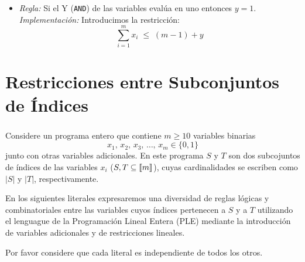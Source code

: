 \documentclass[ 10pt, xcolor = dvipsnames]{beamer}
\begin{document}
\begin{frame}[allowframebreaks]
\frametitle{\insertsection}

\begin{itemize}
\item \emph{Regla:} Si el Y (\texttt{AND}) de las variables eval\'ua en uno entonces $y = 1$. \\[1ex] \emph{Implementaci\'on:} Introducimos la restricci\'on: 
\[
\sum_{i=1}^m x_i \; \leq \; (m-1) + y
\]
\end{itemize}

\end{frame}

\section{Restricciones entre Subconjuntos de \'Indices}

\begin{frame}[allowframebreaks]
\frametitle{\insertsection}

Considere un programa entero que contiene $m \geq 10$ variables binarias
\[
x_1, \, x_2, \, x_3, \, \dots, \, x_m \in \{ 0, 1 \}
\]
junto con otras variables adicionales. En este programa $S$ y $T$ son dos subcojuntos de \'indices de las variables $x_i$ (\ie $S, T \subseteq \llbracket m \rrbracket$), cuyas cardinalidades se escriben \linebreak como $|S|$ y $|T|$, respectivamente. 

En los siguientes literales expresaremos una diversidad de reglas l\'ogicas y combinatoriales entre las variables cuyos \'indices pertenecen a $S$ y a $T$ utilizando el lenguague de la Programaci\'on Lineal Entera (PLE) mediante la introducci\'on de variables adicionales y de restricciones lineales. 

Por favor considere que cada literal es independiente de todos los otros. 

\end{frame}
\end{document}

